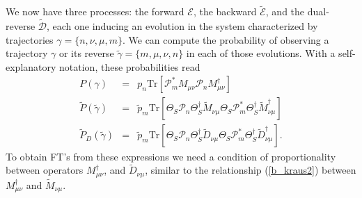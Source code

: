 \documentclass[aps,prx,twocolumn,showpacs,floatfix,superscriptaddress,graphics,longbibliography]{revtex4-1}
\newcommand{\tr}{\mathrm{Tr}}
\newcommand{\E}{{\mathcal E}}
\newcommand{\D}{{\mathcal D}}
\newcommand{\HAT}{}
\begin{document}
We now have three processes: the forward $\E$, the backward $\tilde\E$, and the dual-reverse $\tilde\D$, each one inducing an evolution in the system characterized by trajectories $\gamma=\{n,\nu,\mu,m\}$. 
We can compute the probability of observing a trajectory $\gamma$ or its reverse $\tilde\gamma=\{m,\mu,\nu,n\}$ in each of those evolutions. 
With a self-explanatory notation, these probabilities read
\begin{eqnarray}
P ({\gamma}) &=& p_n \tr[\HAT{\mathcal{P}}_m^{\ast} \HAT{{M}}_{\mu \nu} \HAT{\mathcal{P}}_n\HAT{{M}}_{\mu \nu}^\dagger] \label{forward_p} \\ 
\tilde{P} ({\tilde{\gamma}}) & =& \tilde{p}_m {\tr}[\HAT\Theta_S \HAT{\mathcal{P}}_n 
\HAT\Theta_S^\dagger \HAT{\tilde{M}}_{\nu \mu} \HAT\Theta_S \HAT{\mathcal{P}}_m^{\ast} \HAT\Theta_S^\dagger \HAT{\tilde{M}}_{\nu \mu}^\dagger ] \label{backward_p}\\
\label{dual_p}
\tilde{P}_D(\tilde{\gamma}) &=& \tilde{p}_m \tr[\HAT\Theta_S \HAT{\mathcal{P}}_n \HAT\Theta_S^\dagger \HAT{\tilde{D}}_{\nu \mu}  \HAT\Theta_S \HAT{\mathcal{P}}_m^\ast \HAT\Theta_S^\dagger\HAT{\tilde{D}}_{\nu \mu}^\dagger].
\end{eqnarray}
To obtain FT's from these expressions we need a condition of proportionality between operators $M^\dagger_{\mu\nu}$, and $\tilde D_{\nu\mu}$, similar to the relationship (\ref{b_kraus2}) between $M^\dagger_{\mu\nu}$ and $\tilde M_{\nu\mu}$.
\end{document}
